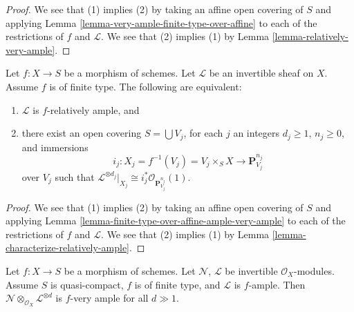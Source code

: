 \begin{proof}
We see that (1) implies (2) by taking an affine open covering of $S$
and applying Lemma \ref{lemma-very-ample-finite-type-over-affine} to
each of the restrictions of $f$ and
$\mathcal{L}$. We see that (2) implies (1) by
Lemma \ref{lemma-relatively-very-ample}.
\end{proof}

\begin{lemma}
\label{lemma-characterize-ample-on-finite-type}
Let $f : X \to S$ be a morphism of schemes.
Let $\mathcal{L}$ be an invertible sheaf on $X$.
Assume $f$ is of finite type.
The following are equivalent:
\begin{enumerate}
\item $\mathcal{L}$ is $f$-relatively ample, and
\item there exist an open covering $S = \bigcup V_j$,
for each $j$ an integers $d_j \geq 1$,
$n_j \geq 0$, and immersions
$$
i_j :
X_j = f^{-1}(V_j) = V_j \times_S X
\longrightarrow
\mathbf{P}^{n_j}_{V_j}
$$
over $V_j$ such that
$\mathcal{L}^{\otimes d_j}|_{X_j} \cong
i_j^*\mathcal{O}_{\mathbf{P}^{n_j}_{V_j}}(1)$.
\end{enumerate}
\end{lemma}

\begin{proof}
We see that (1) implies (2) by taking an affine open covering of $S$
and applying Lemma \ref{lemma-finite-type-over-affine-ample-very-ample} to
each of the restrictions of $f$ and
$\mathcal{L}$. We see that (2) implies (1) by
Lemma \ref{lemma-characterize-relatively-ample}.
\end{proof}

\begin{lemma}
\label{lemma-invertible-add-enough-ample-very-ample}
Let $f : X \to S$ be a morphism of schemes.
Let $\mathcal{N}$, $\mathcal{L}$ be invertible $\mathcal{O}_X$-modules.
Assume $S$ is quasi-compact, $f$ is of finite type, and $\mathcal{L}$
is $f$-ample. Then
$\mathcal{N} \otimes_{\mathcal{O}_X} \mathcal{L}^{\otimes d}$
is $f$-very ample for all $d \gg 1$.
\end{lemma}

